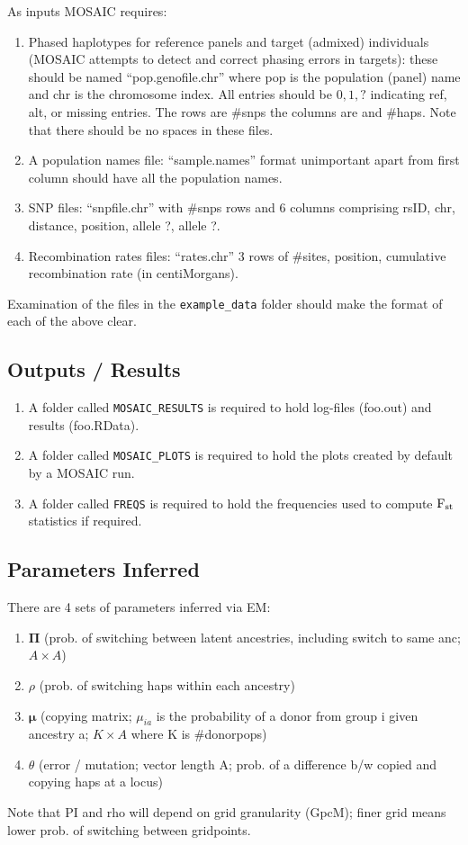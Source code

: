 \documentclass{article}
\begin{document}
As inputs MOSAIC requires:
\begin{enumerate}
  \item Phased haplotypes for reference panels and target (admixed) individuals (MOSAIC attempts to detect and correct phasing errors in targets): 
    these should be named ``pop.genofile.chr'' where pop is the population (panel) name and chr is the chromosome index.  
    All entries should be $0,1,?$ indicating ref, alt, or missing entries. The rows are \#snps the columns are and \#haps. Note that there should be no spaces 
    in these files. 
  \item A population names file: ``sample.names'' format unimportant apart from first column should have all the population names.
  \item SNP files: ``snpfile.chr'' with \#snps rows and 6 columns comprising rsID, chr, distance, position, allele ?, allele ?. 
  \item Recombination rates files: ``rates.chr'' 3 rows of \#sites, position, cumulative recombination rate (in centiMorgans). 
\end{enumerate}
Examination of the files in the \texttt{example\_data} folder should make the format of each of the above clear. 

\subsection{Outputs / Results}
\begin{enumerate}
  \item A folder called \texttt{MOSAIC\_RESULTS} is required to hold log-files (foo.out) and results (foo.RData).  
  \item A folder called \texttt{MOSAIC\_PLOTS} is required to hold the plots created by default by a MOSAIC run.
  \item A folder called \texttt{FREQS} is required to hold the frequencies used to compute $\textrm{F}_{\textrm{st}}$ statistics if required.
\end{enumerate}


\subsection{Parameters Inferred}
There are 4 sets of parameters inferred via EM:
\begin{enumerate}
  \item $\bm\Pi$ (prob. of switching between latent ancestries, including switch to same anc; $A\times A$)
  \item $\rho$ (prob. of switching haps within each ancestry)
  \item $\bm\mu$ (copying matrix; $\mu_{ia}$ is  the probability of a donor from group i given ancestry a; $K\times A$ where K is \#donorpops) 
  \item $\theta$ (error / mutation; vector length A; prob. of a difference b/w copied and copying haps at a locus)
\end{enumerate}
Note that PI and rho will depend on grid granularity (GpcM); finer grid means lower prob. of switching between gridpoints.
\end{document}
